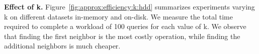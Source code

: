 {{\begin{comment}
		\centering
		\texttt{[image: exact\_mapk\_random\_seismic\_100GB\_256\_de\_100NN\_100\_nocache]}
		\caption{Seismic100GB} 
		\label{fig:approx:accuracy:random:seismic:100GB:256:hdd:de:100NN:100:nocache}
	\end{subfigure}
	\begin{subfigure}{0.19\textwidth}
		\centering
		\caption{Sift250GB} 
		\label{fig:approx:accuracy:random:sift:250GB:128:hdd:de:100NN:100:nocache}
	\end{subfigure}
	\begin{subfigure}{0.19\textwidth}
		\centering
		\caption{Deep250GB} 
		\label{fig:approx:accuracy:random:deep:250GB:96:hdd:de:100NN:100:nocache}
	\end{subfigure}
	\caption{Number of random accesses  vs. accuracy (100-NN)}	
	\label{fig:approx:accuracy:random:250GB:hdd}
\end{figure*}
\end{comment}

\noindent\textbf{Effect of k.} Figure~\ref{fig:approx:efficiency:k:hdd} summarizes experiments varying k on different datasets in-memory and on-disk. 
We measure the total time required to complete a workload of 100 queries for each value of k. 
We observe that %
finding the first neighbor is the most costly operation, while finding the additional neighbors is much cheaper. 

}}
